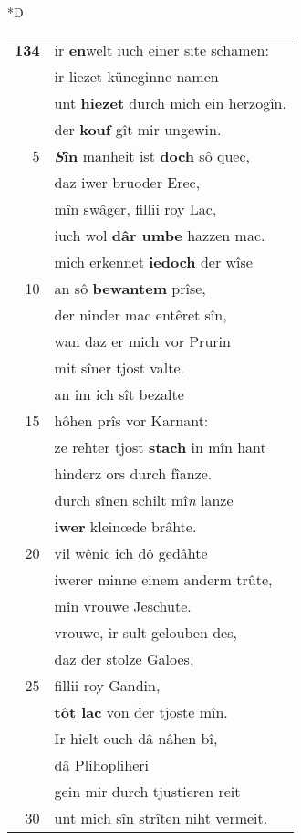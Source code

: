 \documentclass[8pt,a4paper,notitlepage]{article}
\begin{document}
\begin{table}[ht]
\begin{minipage}[t]{0.5\linewidth}
\small
\begin{center}*D
\end{center}
\begin{tabular}{rl}
\textbf{134} & ir \textbf{en}welt iuch einer site schamen:\\ 
 & ir liezet küneginne namen\\ 
 & unt \textbf{hiezet} durch mich ein herzogîn.\\ 
 & der \textbf{kouf} gît mir ungewin.\\ 
5 & \textbf{\textit{S}în} manheit ist \textbf{doch} sô quec,\\ 
 & daz iwer bruoder Erec,\\ 
 & mîn swâger, fillii roy Lac,\\ 
 & iuch wol \textbf{dâr umbe} hazzen mac.\\ 
 & mich erkennet \textbf{iedoch} der wîse\\ 
10 & an sô \textbf{bewantem} prîse,\\ 
 & der ninder mac entêret sîn,\\ 
 & wan daz er mich vor Prurin\\ 
 & mit sîner tjost valte.\\ 
 & an im ich sît bezalte\\ 
15 & hôhen prîs vor Karnant:\\ 
 & ze rehter tjost \textbf{stach} in mîn hant\\ 
 & hinderz ors durch fîanze.\\ 
 & durch sînen schilt mî\textit{n} lanze\\ 
 & \textbf{iwer} kleinœde brâhte.\\ 
20 & vil wênic ich dô gedâhte\\ 
 & iwerer minne einem anderm trûte,\\ 
 & mîn vrouwe Jeschute.\\ 
 & vrouwe, ir sult gelouben des,\\ 
 & daz der stolze Galoes,\\ 
25 & fillii roy Gandin,\\ 
 & \textbf{tôt lac} von der tjoste mîn.\\ 
 & Ir hielt ouch dâ nâhen bî,\\ 
 & dâ Plihopliheri\\ 
 & gein mir durch tjustieren reit\\ 
30 & unt mich sîn strîten niht vermeit.\\ 

\end{tabular}
\end{minipage}
\end{table}
\end{document}
